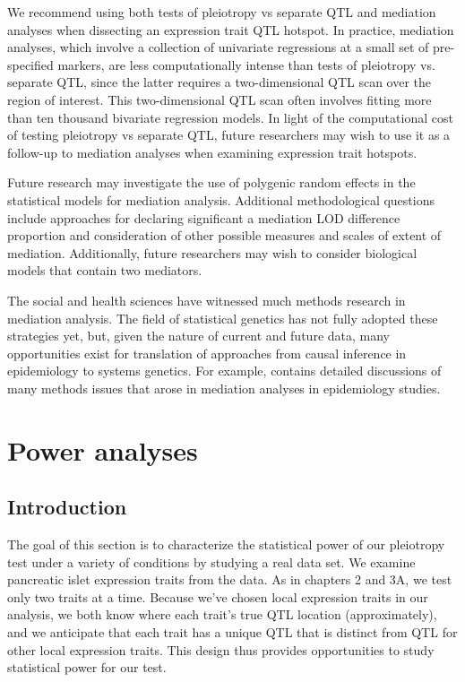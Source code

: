 \documentclass[oneside]{book}
\begin{document}
We recommend using both tests of pleiotropy vs separate QTL and mediation analyses when dissecting an expression trait QTL hotspot. In practice, mediation analyses, which involve a collection of univariate regressions at a small set of pre-specified markers, are less computationally intense than tests of pleiotropy vs. separate QTL, since the latter requires a two-dimensional QTL scan over the region of interest. This two-dimensional QTL scan often involves fitting more than ten thousand bivariate regression models. In light of the computational cost of testing pleiotropy vs separate QTL, future researchers may wish to use it as a follow-up to mediation analyses when examining expression trait hotspots.

Future research may investigate the use of polygenic random effects in the statistical models for mediation analysis. Additional methodological questions include approaches for declaring significant a mediation LOD difference proportion and consideration of other possible measures and scales of extent of mediation. Additionally, future researchers may wish to consider biological models that contain two mediators.

The social and health sciences have witnessed much methods research in mediation analysis. The field of statistical genetics has not fully adopted these strategies yet, but, given the nature of current and future data, many opportunities exist for translation of approaches from causal inference in epidemiology to systems genetics. For example, \citet{vanderweele2015explanation} contains detailed discussions of many methods issues that arose in mediation analyses in epidemiology studies.




\section{Power analyses}

\subsection{Introduction}

The goal of this section is to characterize the statistical power of our pleiotropy test under a variety of conditions by studying a real data set. 
We examine pancreatic islet expression traits from the \citet{keller2018genetic} data. 
As in chapters 2 and 3A, we test only two traits at a time. 
Because we’ve chosen local expression traits in our analysis, we both know where each trait’s true QTL location (approximately), 
and we anticipate that each trait has a unique QTL that is distinct from QTL for other local expression traits. 
This design thus provides opportunities to study statistical power for our test.
\end{document}
